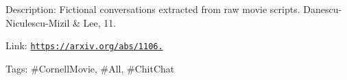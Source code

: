 Description\+: Fictional conversations extracted from raw movie scripts. Danescu-\/\+Niculescu-\/\+Mizil \& Lee, \textquotesingle{}11.

Link\+: \href{https://arxiv.org/abs/1106.3077}{\tt https\+://arxiv.\+org/abs/1106.}

Tags\+: \#\+Cornell\+Movie, \#\+All, \#\+Chit\+Chat 